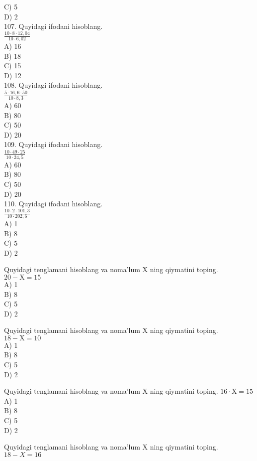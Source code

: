 C) 5\\
D) 2\\
107. Quyidagi ifodani hisoblang.\\
$\frac{10 \cdot 8 \cdot 12,04}{10 \cdot 6,02}$\\
A) 16\\
B) 18\\
C) 15\\
D) 12\\
108. Quyidagi ifodani hisoblang.\\
$\frac{5 \cdot 16,6 \cdot 50}{10 \cdot 8,3}$\\
A) 60\\
B) 80\\
C) 50\\
D) 20\\
109. Quyidagi ifodani hisoblang.\\
$\frac{10 \cdot 49 \cdot 25}{10 \cdot 24,5}$\\
A) 60\\
B) 80\\
C) 50\\
D) 20\\
110. Quyidagi ifodani hisoblang.\\
$\frac{10 \cdot 2 \cdot 101,3}{10 \cdot 202,6}$\\
A) 1\\
B) 8\\
C) 5\\
D) 2
  \item Quyidagi tenglamani hisoblang va noma'lum X ning qiymatini toping.\\
$20-\mathrm{X}=15$\\
A) 1\\
B) 8\\
C) 5\\
D) 2\\
  \item Quyidagi tenglamani hisoblang va noma'lum X ning qiymatini toping. $18-\mathrm{X}=10$\\
A) 1\\
B) 8\\
C) 5\\
D) 2
  \item Quyidagi tenglamani hisoblang va noma'lum X ning qiymatini toping. $16 \cdot \mathrm{X}=15$\\
A) 1\\
B) 8\\
C) 5\\
D) 2
  \item Quyidagi tenglamani hisoblang va noma'lum X ning qiymatini toping. $18-X=16$\\
